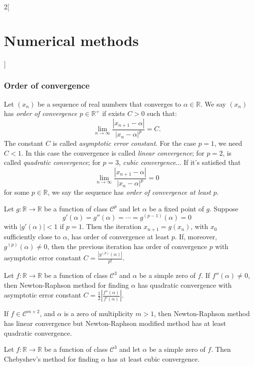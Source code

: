 \documentclass[class=article,10pt,crop=false]{standalone}
\begin{document}
\begin{multicols}{2}[\section{Numerical methods}]
\subsubsection*{Order of convergence}
\begin{definition}
Let $(x_n)$ be a sequence of real numbers that converges to $\alpha\in\mathbb{R}$. We say $(x_n)$ has \textit{order of convergence $p\in\mathbb{R}^+$} if exists $C>0$ such that: $$\lim_{n\to\infty}\frac{|x_{n+1}-\alpha|}{|x_n-\alpha|^p}=C.$$ The constant $C$ is called \textit{asymptotic error constant}. For the case $p=1$, we need $C<1$. In this case the convergence is called \textit{linear convergence}; for $p=2$, is called \textit{quadratic convergence}; for $p=3$, \textit{cubic convergence}... If it's satisfied that $$\lim_{n\to\infty}\frac{|x_{n+1}-\alpha|}{|x_n-\alpha|^p}=0$$ for some $p\in\mathbb{R}$, we say the sequence has \textit{order of convergence at least $p$}.
\end{definition}
\begin{theorem}
Let $g:\mathbb{R}\rightarrow\mathbb{R}$ be a function of class $\mathcal{C}^p$ and let $\alpha$ be a fixed point of $g$. Suppose $$g'(\alpha)=g''(\alpha)=\cdots=g^{(p-1)}(\alpha)=0$$ with $|g'(\alpha)|<1$ if $p=1$. Then the iteration $x_{n+1}=g(x_n)$, with $x_0$ sufficiently close to $\alpha$, has order of convergence at least $p$. If, moreover, $g^{(p)}(\alpha)\ne0$, then the previous iteration has order of convergence $p$ with asymptotic error constant $C=\frac{|g^{(p)}(\alpha)|}{p!}$.
\end{theorem}
\begin{theorem}
Let $f:\mathbb{R}\rightarrow\mathbb{R}$ be a function of class $\mathcal{C}^3$ and $\alpha$ be a simple zero of $f$. If $f''(\alpha)\ne0$, then Newton-Raphson method for finding $\alpha$ has quadratic convergence with asymptotic error constant $C=\frac{1}{2}\left|\frac{f''(\alpha)}{f'(\alpha)}\right|$.\par If $f\in\mathcal{C}^{m+2}$, and $\alpha$ is a zero of multiplicity $m>1$, then Newton-Raphson method has linear convergence but Newton-Raphson modified method has at least quadratic convergence.
\end{theorem}
\begin{theorem}
Let $f:\mathbb{R}\rightarrow\mathbb{R}$ be a function of class $\mathcal{C}^3$ and let $\alpha$ be a simple zero of $f$. Then Chebyshev's method for finding $\alpha$ has at least cubic convergence.
\end{theorem}
\begin{definition}

\end{definition}
\end{multicols}
\end{document}
